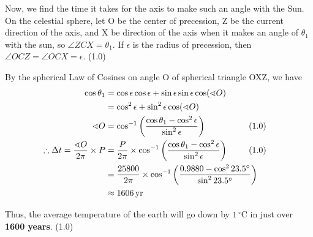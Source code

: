 Now, we find the time it takes for the axis to make such an angle with the Sun. On the
celestial sphere, let O be the center of precession, Z be the current direction of the axis,
and X be direction of the axis when it makes an angle of $\theta_1$ with the sun, so
$\angle ZCX = \theta_1$. If $\epsilon$ is the radius of precession, then
$\angle OCZ = \angle OCX = \epsilon$. \hfill(1.0)

By the spherical Law of Cosines on angle O of spherical triangle OXZ, we have
\begin{align*}
\cos\theta_1 &= \cos\epsilon\cos\epsilon + \sin\epsilon\sin\epsilon\cos(\sphericalangle O)\\
 &= \cos^2\epsilon + \sin^2\epsilon\cos(\sphericalangle O)\\
\sphericalangle O &= \cos^{-1}\left(\frac{\cos\theta_1 - \cos^2\epsilon}{\sin^2\epsilon}\right)
  & &\hspace{-2em}(1.0)\\
\therefore \Delta t = \frac{\sphericalangle O}{2\pi}\times P
 &= \frac{P}{2\pi}\times\cos^{-1}\left(\frac{\cos\theta_1 - \cos^2\epsilon}{\sin^2\epsilon}\right)
  & &\hspace{-2em}(1.0)\\
 &= \frac{25800}{2\pi}\times\cos^{-1}\left(\frac{0.9880 - \cos^2 23.5^\circ}{\sin^2 23.5^\circ}\right)\\
 &\approx 1606\,\mathrm{yr}
\end{align*}

Thus, the average temperature of the earth will go down by $1\,^\circ\mathrm{C}$ in just over
\textbf{1600 years}. \hfill(1.0)


